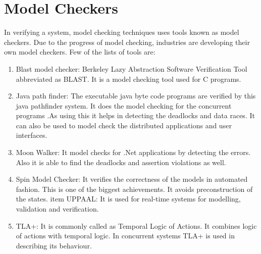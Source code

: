 \documentclass{article}
\begin{document}
\section{Model Checkers}
In verifying a system, model checking techniques uses tools known as model checkers. Due to the progress of model checking, industries are developing their own model checkers. 
Few of the lists of tools are:\newline
\begin{enumerate}
\item  Blast model checker: Berkeley Lazy Abstraction Software Verification Tool abbreviated as BLAST. It is a model checking tool used for C programs.\newline
\item Java path finder: The executable java byte code programs are verified by this java pathfinder system. It does the model checking for the concurrent programs .As using this it helps in detecting the deadlocks and data races. It can also be used to model check the distributed applications and user interfaces.\newline
\item Moon Walker: It model checks for .Net applications by detecting the errors. Also it is able to find the deadlocks and assertion violations as well.\newline
\item Spin Model Checker: It verifies the correctness of the models in automated fashion. This is one of the biggest achievements. It avoids preconstruction of the states.\newline
item UPPAAL: It is used for real-time systems for modelling, validation and verification.\newline
\item TLA+: It is commonly called as Temporal Logic of Actions. It combines logic of actions with temporal logic. In concurrent systems TLA+ is used in describing its behaviour.\newline

\end{enumerate}
\end{document}

